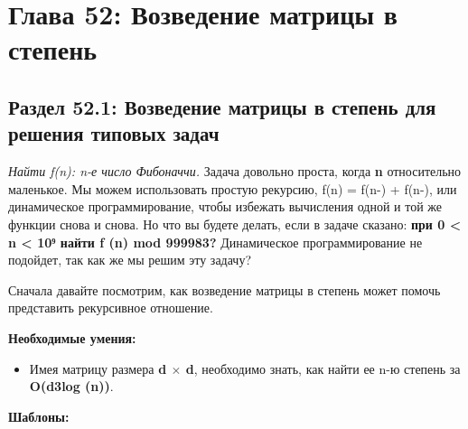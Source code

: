 \chapter*{Глава 52: Возведение матрицы в степень}
\section*{Раздел 52.1: Возведение матрицы в степень для решения типовых задач}

\textit{Найти f(n): n-е число Фибоначчи.} Задача довольно проста, когда \textbf{n} относительно маленькое. Мы можем использовать простую рекурсию, f(n) = f(n-) + f(n-), или динамическое программирование, чтобы избежать вычисления одной и той же функции снова и снова. Но что вы будете делать, если в задаче сказано: \textbf{при 0 < n < 10⁹ найти f (n) mod 999983?} Динамическое программирование не подойдет, так как же мы решим эту задачу?
\vspace{\baselineskip}

Сначала давайте посмотрим, как возведение матрицы в степень может помочь представить рекурсивное отношение.
\vspace{\baselineskip}

\textbf{Необходимые умения:}
\begin{itemize}
     две матрицы, необходимо знать, как найти их произведение. Далее, имея матрицу, полученную путем перемножения этих двух матриц, и одну из этих матриц, необходимо знать, как найти другую матрицу.
    \item Имея матрицу размера \textbf{d $\times$ d}, необходимо знать, как найти ее n-ю степень за \textbf{O(d3log (n))}.
\end{itemize}
\textbf{Шаблоны:}

